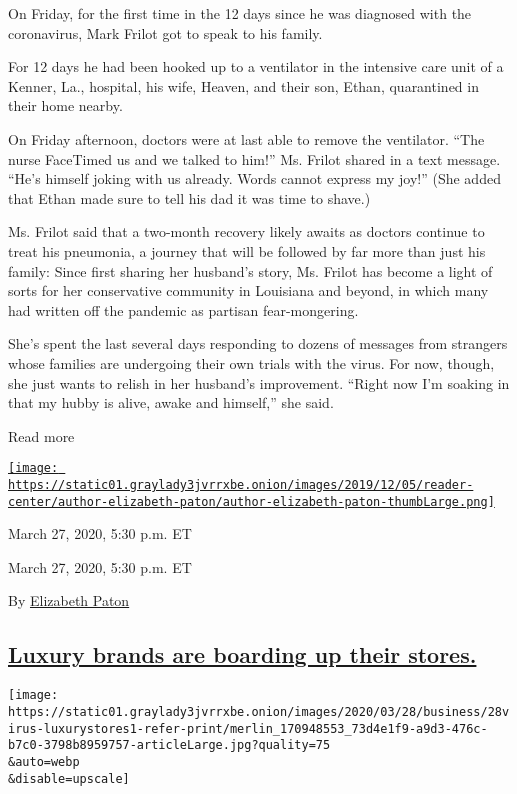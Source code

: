 On Friday, for the first time in the 12 days since he was diagnosed with
the coronavirus, Mark Frilot got to speak to his family.

For 12 days he had been hooked up to a ventilator in the intensive care
unit of a Kenner, La., hospital, his wife, Heaven, and their son, Ethan,
quarantined in their home nearby.

On Friday afternoon, doctors were at last able to remove the ventilator.
``The nurse FaceTimed us and we talked to him!'' Ms. Frilot shared in a
text message. ``He's himself joking with us already. Words cannot
express my joy!'' (She added that Ethan made sure to tell his dad it was
time to shave.)

Ms. Frilot said that a two-month recovery likely awaits as doctors
continue to treat his pneumonia, a journey that will be followed by far
more than just his family: Since first sharing her husband's story, Ms.
Frilot has become a light of sorts for her conservative community in
Louisiana and beyond, in which many had written off the pandemic as
partisan fear-mongering.

She's spent the last several days responding to dozens of messages from
strangers whose families are undergoing their own trials with the virus.
For now, though, she just wants to relish in her husband's improvement.
``Right now I'm soaking in that my hubby is alive, awake and himself,''
she said.

Read more

\href{https://www.nytimes3xbfgragh.onion/by/elizabeth-paton}{\texttt{[image: https://static01.graylady3jvrrxbe.onion/images/2019/12/05/reader-center/author-elizabeth-paton/author-elizabeth-paton-thumbLarge.png]}}

March 27, 2020, 5:30 p.m. ET

March 27, 2020, 5:30 p.m. ET

By
\href{https://www.nytimes3xbfgragh.onion/by/elizabeth-paton}{Elizabeth
Paton}

\hypertarget{luxury-brands-are-boarding-up-their-stores}{%
\subsection{\texorpdfstring{\protect\hyperlink{luxury-brands-are-boarding-up-their-stores}{Luxury
brands are boarding up their
stores.}}{Luxury brands are boarding up their stores.}}\label{luxury-brands-are-boarding-up-their-stores}}

\texttt{[image: https://static01.graylady3jvrrxbe.onion/images/2020/03/28/business/28virus-luxurystores1-refer-print/merlin\_170948553\_73d4e1f9-a9d3-476c-b7c0-3798b8959757-articleLarge.jpg?quality=75\\\&auto=webp\\\&disable=upscale]}

